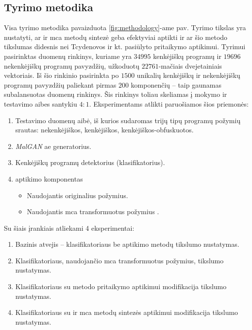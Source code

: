 
\subsection{Tyrimo metodika}

Visa tyrimo metodika pavaizduota \ref{fig:methodology}-ame pav. Tyrimo tikslas yra nustatyti, ar \LIME ir \gls{mca} metodų sintezė geba efektyviai aptikti  ir ar šio metodo tikslumas didesnis nei Tcydenovos ir kt. pasiūlyto \LIME pritaikymo  aptikimui. Tyrimui pasirinktas \SLEIPNIR \cite{al-dujailiAdversarialDeepLearning2018} duomenų rinkinys, kuriame yra $34995$ kenkėjiškų programų ir $19696$ nekenkėjiškų programų pavyzdžių, užkoduotų $22761$-mačiais dvejetainiais vektoriais. Iš šio rinkinio pasirinkta po $1500$ unikalių kenkėjiškų ir nekenkėjiškų programų pavyzdžių paliekant pirmas $200$ komponenčių -- taip gaunamas subalansuotas duomenų rinkinys. Šis rinkinys toliau skeliamas į mokymo ir testavimo aibes santykiu $4:1$. Eksperimentams atlikti paruošiamos šios priemonės:
\begin{enumerate}
    \item Testavimo duomenų aibė, iš kurios sudaromas trijų tipų programų požymių srautas: nekenkėjiškos, kenkėjiškos, kenkėjiškos-obfuskuotos.
    \item \textit{MalGAN} \cite{huGeneratingAdversarialMalware2017} \gls{ae} generatorius.
    \item Kenkėjiškų programų detektorius (klasifikatorius).
    \item {} aptikimo komponentas
    \begin{itemize}
        \item Naudojantis originalius požymius.
        \item Naudojantis \gls{mca} transformuotus požymius .
    \end{itemize}
\end{enumerate}

Su šiais įrankiais atliekami 4 eksperimentai:
\begin{enumerate}
    \item Bazinis atvejis -- klasifikatoriaus be  aptikimo metodų tikslumo nustatymas.
    \item Klasifikatoriaus, naudojančio \gls{mca} transformuotus požymius, tikslumo nustatymas.
    \item Klasifikatoriaus su \LIME metodo pritaikymo  aptikimui modifikacija tikslumo nustatymas.
    \item Klasifikatoriaus su \LIME ir \gls{mca} metodų sintezės  aptikimui modifikacija tikslumo nustatymas.
\end{enumerate}


